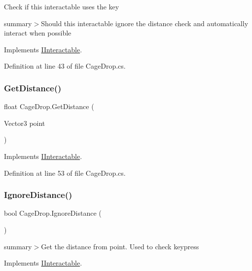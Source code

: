 Check if this interactable uses the key

summary$>$Should this interactable ignore the distance check and automatically interact when possible

Implements \mbox{\hyperlink{interface_i_interactable_a5142ebbddd5d91a93da436941ad77d8e}{I\+Interactable}}.



Definition at line 43 of file Cage\+Drop.\+cs.

\mbox{\label{class_cage_drop_a57457a58730ee0fbad7693ef9d9a78d7}} 
\subsubsection{\texorpdfstring{Get\+Distance()}{GetDistance()}}
{\footnotesize\ttfamily float Cage\+Drop.\+Get\+Distance (\begin{DoxyParamCaption}\item[{Vector3}]{point }\end{DoxyParamCaption})}



Implements \mbox{\hyperlink{interface_i_interactable_acde3047364ffe9a4ed107513feb21675}{I\+Interactable}}.



Definition at line 53 of file Cage\+Drop.\+cs.

\mbox{\label{class_cage_drop_a4f05fa4967d7317ffd43b8e7b9e42e3d}} 
\subsubsection{\texorpdfstring{Ignore\+Distance()}{IgnoreDistance()}}
{\footnotesize\ttfamily bool Cage\+Drop.\+Ignore\+Distance (\begin{DoxyParamCaption}{ }\end{DoxyParamCaption})}



summary$>$Get the distance from point. Used to check keypress



Implements \mbox{\hyperlink{interface_i_interactable_ad184024a0cc6bce38ebcd77c0126fcc5}{I\+Interactable}}.



